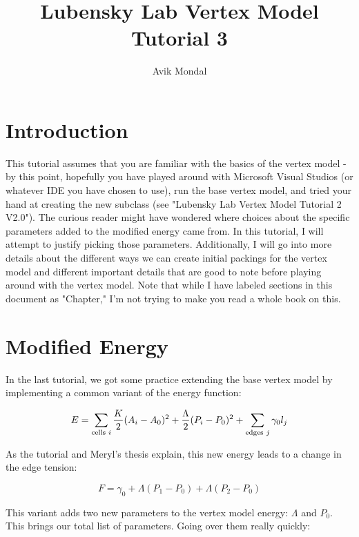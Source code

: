 \documentclass[12pt,a4paper]{article}
\begin{document}
\title{Lubensky Lab Vertex Model Tutorial 3}
\author{Avik Mondal}
\maketitle{}

\section{Introduction}

This tutorial assumes that you are familiar with the basics of the vertex model - by this point, hopefully you have played around with Microsoft Visual Studios (or whatever IDE you have chosen to use), run the base vertex model, and tried your hand at creating the new subclass (see "Lubensky Lab Vertex Model Tutorial 2 V2.0"). The curious reader might have wondered where choices about the  specific parameters added to the modified energy came from. In this tutorial, I will attempt to justify picking those parameters. Additionally, I will go into more details about the different ways we can create initial packings for the vertex model and different important details that are good to note before playing around with the vertex model. Note that while I have labeled sections in this document as "Chapter," I'm not trying to make you read a whole book on this.

\section{Modified Energy}
In the last tutorial, we got some practice extending the base vertex model by implementing a common variant of the energy function:

\begin{center}
\begin{equation}
\label{Perimetervariant}
E =  \sum_{\text{cells} \hspace{1mm} i} \frac{K}{2} (A_i - A_0)^2 + \frac{\Lambda}{2} (P_i - P_0)^2 + \sum_{\text{edges} \hspace{1mm} j} \gamma_0 l_j
\end{equation}
\end{center}

As the tutorial and Meryl's thesis explain, this new energy leads to a change in the edge tension:
\begin{center}
\begin{equation}
\label{edgetensions}
F = \gamma_0 + \Lambda (P_1 - P_0) + \Lambda (P_2 - P_0)
\end{equation}
\end{center}
This variant adds two new parameters to the vertex model energy: $\Lambda$ and $P_0$. This brings our total list of parameters. Going over them really quickly:
\end{document}

